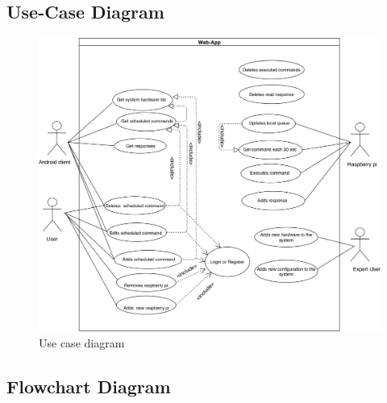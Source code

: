 \documentclass[12pt]{paper}
\begin{document}
		\subsection{Use-Case Diagram}
			\begin{figure}[H]
			\includegraphics[width=\linewidth]{img/diagram_usecase.png}
			\caption{Use case diagram}
			\label{fig:diagram_usecase}
		\end{figure}
		\subsection{Flowchart Diagram}
		
\end{document}
